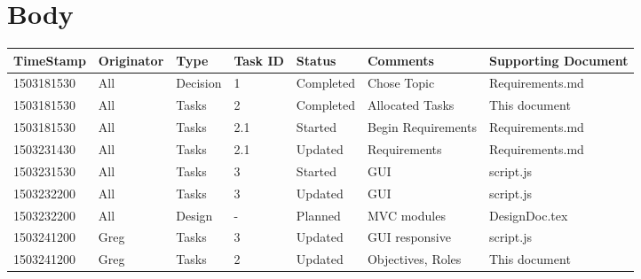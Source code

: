 \documentclass[10pt, oneside]{article}
\begin{document}

\section{Body}

\setlength{\tabcolsep}{5pt}
\begin{tabular}{|p{1.8cm}|p{1.75cm}|p{1.25cm}|p{0.8cm}|p{1.6cm}|p{3cm}|p{2.8cm}|}

	\hline
	TimeStamp & Originator & Type & Task ID & Status & Comments & Supporting Document \\
	\hline
	1503181530 & All & Decision & 1 & Completed & Chose Topic & Requirements.md \\
	\hline
	1503181530 & All & Tasks & 2 & Completed & Allocated Tasks & This document \\
	\hline
	1503181530 & All & Tasks & 2.1 & Started & Begin Requirements & Requirements.md \\
	\hline
	1503231430 & All & Tasks & 2.1 & Updated & Requirements & Requirements.md \\
	\hline
	1503231530 & All & Tasks & 3 & Started & GUI & script.js \\
	\hline
	1503232200 & All & Tasks & 3 & Updated & GUI & script.js \\
	\hline 
	1503232200 & All & Design & - & Planned & MVC modules & DesignDoc.tex \\
	\hline
	1503241200 & Greg & Tasks & 3 & Updated & GUI responsive & script.js \\
	\hline
	1503241200 & Greg & Tasks & 2 & Updated & Objectives, Roles & This document \\
	\hline
\end{tabular}
\end{document}
